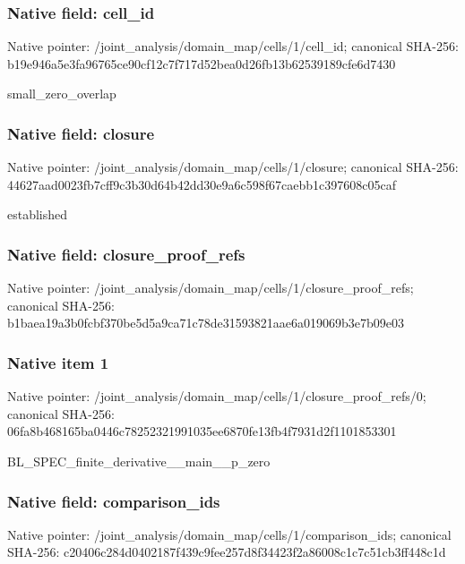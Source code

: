\documentclass[10pt,a4paper]{article}
\begin{document}
\subsubsection{Native field: cell\_\allowbreak{}id}
Native pointer: /joint\_\allowbreak{}analysis/domain\_\allowbreak{}map/cells/1/cell\_\allowbreak{}id; canonical SHA-256: b19e946a5e3fa96765ce90cf12c7f717d52bea0d26fb13b62539189cfe6d7430

\begingroup\raggedright\sloppy small\_\allowbreak{}zero\_\allowbreak{}overlap\par\endgroup

\subsubsection{Native field: closure}
Native pointer: /joint\_\allowbreak{}analysis/domain\_\allowbreak{}map/cells/1/closure; canonical SHA-256: 44627aad0023fb7cff9c3b30d64b42dd30e9a6c598f67caebb1c397608c05caf

\begingroup\raggedright\sloppy established\par\endgroup

\subsubsection{Native field: closure\_\allowbreak{}proof\_\allowbreak{}refs}
Native pointer: /joint\_\allowbreak{}analysis/domain\_\allowbreak{}map/cells/1/closure\_\allowbreak{}proof\_\allowbreak{}refs; canonical SHA-256: b1baea19a3b0fcbf370be5d5a9ca71c78de31593821aae6a019069b3e7b09e03

\subsubsection{Native item 1}
Native pointer: /joint\_\allowbreak{}analysis/domain\_\allowbreak{}map/cells/1/closure\_\allowbreak{}proof\_\allowbreak{}refs/0; canonical SHA-256: 06fa8b468165ba0446c78252321991035ee6870fe13fb4f7931d2f1101853301

\begingroup\raggedright\sloppy BL\_\allowbreak{}SPEC\_\allowbreak{}finite\_\allowbreak{}derivative\_\allowbreak{}\_\allowbreak{}main\_\allowbreak{}\_\allowbreak{}p\_\allowbreak{}zero\par\endgroup

\subsubsection{Native field: comparison\_\allowbreak{}ids}
Native pointer: /joint\_\allowbreak{}analysis/domain\_\allowbreak{}map/cells/1/comparison\_\allowbreak{}ids; canonical SHA-256: c20406c284d0402187f439c9fee257d8f34423f2a86008c1c7c51cb3ff448c1d
\end{document}
